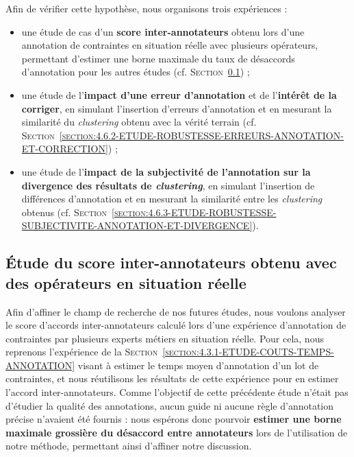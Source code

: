	
	Afin de vérifier cette hypothèse, nous organisons trois expériences :
	\begin{itemize}
		\item une étude de cas d'un \textbf{score inter-annotateurs} obtenu lors d'une annotation de contraintes en situation réelle avec plusieurs opérateurs, permettant d'estimer une borne maximale du taux de désaccords d'annotation pour les autres études (cf. \textsc{Section~\ref{section:4.6.1-ETUDE-ROBUSTESSE-SCORE-ACCORD}}) ;
		\item une étude de l'\textbf{impact d'une erreur d'annotation} et de l'\textbf{intérêt de la corriger}, en simulant l'insertion d'erreurs d'annotation et en mesurant la similarité du \textit{clustering} obtenu avec la vérité terrain (cf. \textsc{Section~\ref{section:4.6.2-ETUDE-ROBUSTESSE-ERREURS-ANNOTATION-ET-CORRECTION}}) ;
		\item une étude de l'\textbf{impact de la subjectivité de l'annotation sur la divergence des résultats de \textit{clustering}}, en simulant l'insertion de différences d'annotation et en mesurant la similarité entre les \textit{clustering} obtenus (cf. \textsc{Section~\ref{section:4.6.3-ETUDE-ROBUSTESSE-SUBJECTIVITE-ANNOTATION-ET-DIVERGENCE}}).
	\end{itemize}
		
		
	\subsection{Étude du score inter-annotateurs obtenu avec des opérateurs en situation réelle}
	\label{section:4.6.1-ETUDE-ROBUSTESSE-SCORE-ACCORD}
		
		Afin d'affiner le champ de recherche de nos futures études, nous voulons analyser le score d'accords inter-annotateurs calculé lors d'une expérience d'annotation de contraintes par plusieurs experts métiers en situation réelle.
		Pour cela, nous reprenons l'expérience de la \textsc{Section~\ref{section:4.3.1-ETUDE-COUTS-TEMPS-ANNOTATION}} visant à estimer le temps moyen d'annotation d'un lot de contraintes, et nous réutilisons les résultats de cette expérience pour en estimer l'accord inter-annotateurs.
		Comme l'objectif de cette précédente étude n'était pas d'étudier la qualité des annotations, aucun guide ni aucune règle d'annotation précise n'avaient été fournis : nous espérons donc pourvoir \textbf{estimer une borne maximale grossière du désaccord entre annotateurs} lors de l'utilisation de notre méthode, permettant ainsi d'affiner notre discussion.
		
